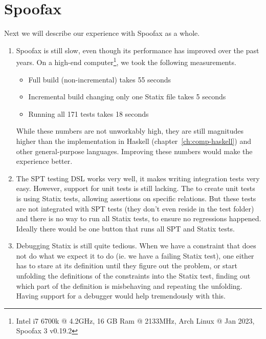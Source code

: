 \section{Spoofax}

Next we will describe our experience with Spoofax as a whole. 

\begin{enumerate}
	\item Spoofax is still slow, even though its performance has improved over the past years. On a high-end computer\footnote{Intel i7 6700k @ 4.2GHz, 16 GB Ram @ 2133MHz, Arch Linux @ Jan 2023, Spoofax 3 v0.19.2}, we took the following measurements.
	\begin{itemize}
		\item Full build (non-incremental) takes 55 seconds
		\item Incremental build changing only one Statix file takes 5 seconds
		\item Running all 171 tests takes 18 seconds
	\end{itemize}
	While these numbers are not unworkably high, they are still magnitudes higher than the implementation in Haskell (chapter~\ref{ch:comp-haskell}) and other general-purpose languages. Improving these numbers would make the experience better.
	
	\item The SPT testing DSL works very well, it makes writing integration tests very easy. However, support for unit tests is still lacking. The to create unit tests is using Statix tests, allowing assertions on specific relations. But these tests are not integrated with SPT tests (they don't even reside in the test folder) and there is no way to run all Statix tests, to ensure no regressions happened. Ideally there would be one button that runs all SPT and Statix tests.
	
	\item Debugging Statix is still quite tedious. When we have a constraint that does not do what we expect it to do (ie. we have a failing Statix test), one either has to stare at its definition until they figure out the problem, or start unfolding the definitions of the constraints into the Statix test, finding out which part of the definition is misbehaving and repeating the unfolding. Having support for a debugger would help tremendously with this.
\end{enumerate}

